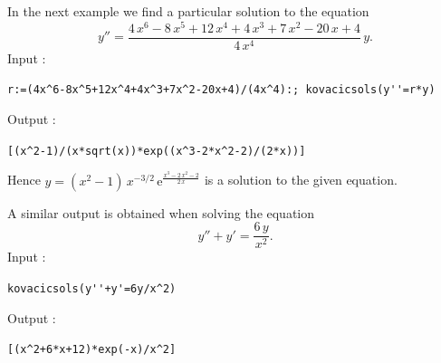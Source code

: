 \documentclass[a4paper,11pt]{book}
\begin{document}
In the next example we find a particular solution to the equation
\[ y''=\frac{4\,x^6-8\,x^5+12\,x^4+4\,x^3+7\,x^2-20\,x+4}{4\,x^4}\,y. \]
Input :
\begin{center}
  \tt r:=(4x\verb|^|6-8x\verb|^|5+12x\verb|^|4+4x\verb|^|3+7x\verb|^|2-20x+4)/(4x\verb|^|4):; kovacicsols(y\verb|''|=r*y)
\end{center}
Output :
\begin{center}
  \tt [(x\verb|^|2-1)/(x*sqrt(x))*exp((x\verb|^|3-2*x\verb|^|2-2)/(2*x))]
\end{center}
Hence $y=(x^2-1)\,x^{-3/2}\,\mathrm{e}^{\frac{x^3-2\,x^2-2}{2\,x}}$ is a solution to the given equation.

A similar output is obtained when solving the equation
\[ y''+y'=\frac{6\,y}{x^2}. \]
Input :
\begin{center}
  \tt kovacicsols(y\verb|''|+y\verb|'|=6y/x\verb|^|2)
\end{center}
Output :
\begin{center}
  \tt [(x\verb|^|2+6*x+12)*exp(-x)/x\verb|^|2]
\end{center}
\end{document}
